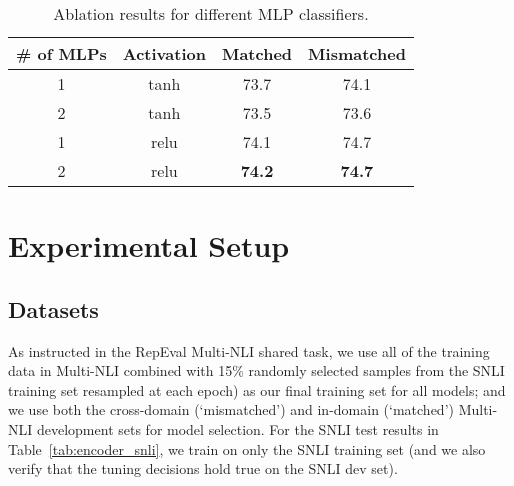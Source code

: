 \documentclass[11pt,letterpaper]{article}
\begin{document}
\begin{table}[ht!]
\begin{center}
\small
\begin{tabular}{|cc|cc|}
\hline
\# of MLPs & Activation & Matched & Mismatched \\
\hline
1 & tanh & 73.7 & 74.1\\
2 & tanh & 73.5 & 73.6\\
1 & relu & 74.1 & 74.7\\
2 & relu & \textbf{74.2} & \textbf{74.7}\\
\hline
\end{tabular}
\end{center}
\caption{Ablation results for different MLP classifiers.}\label{tab:classifier}
\end{table}

\section{Experimental Setup}
\subsection{Datasets}
As instructed in the RepEval Multi-NLI shared task, we use all of the training data in Multi-NLI combined with 15\% randomly selected samples from the SNLI training set resampled at each epoch) as our final training set for all models; and we use both the cross-domain (`mismatched') and in-domain (`matched') Multi-NLI development sets for model selection. For the SNLI test results in Table~\ref{tab:encoder_snli}, we train on only the SNLI training set (and we also verify that the tuning decisions hold true on the SNLI dev set).
\end{document}
